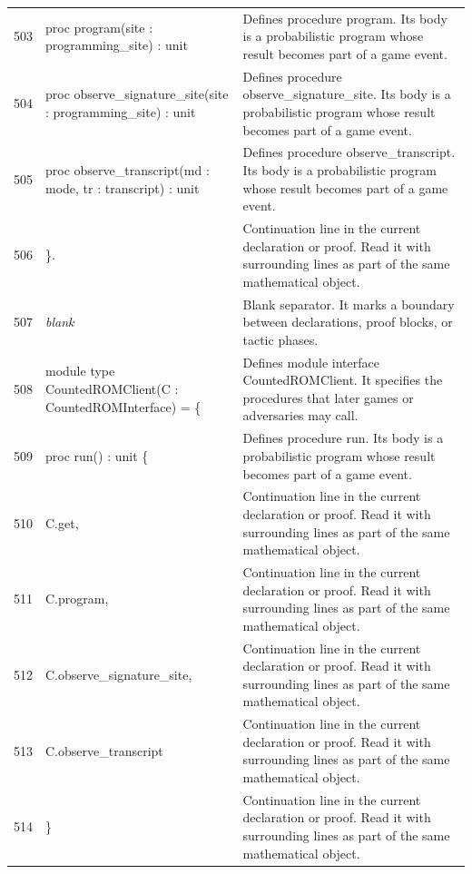\documentclass[10pt]{article}
\begin{document}
\begin{longtable}{r L{0.53\textwidth} L{0.37\textwidth}}
503 & {\ttfamily\scriptsize   proc program(site : programming\_site) : unit} & Defines procedure program.  Its body is a probabilistic program whose result becomes part of a game event. \\
504 & {\ttfamily\scriptsize   proc observe\_signature\_site(site : programming\_site) : unit} & Defines procedure observe\_signature\_site.  Its body is a probabilistic program whose result becomes part of a game event. \\
505 & {\ttfamily\scriptsize   proc observe\_transcript(md : mode, tr : transcript) : unit} & Defines procedure observe\_transcript.  Its body is a probabilistic program whose result becomes part of a game event. \\
506 & {\ttfamily\scriptsize \}.} & Continuation line in the current declaration or proof.  Read it with surrounding lines as part of the same mathematical object. \\
507 & {\ttfamily\scriptsize \emph{blank}} & Blank separator.  It marks a boundary between declarations, proof blocks, or tactic phases. \\
508 & {\ttfamily\scriptsize module type CountedROMClient(C : CountedROMInterface) = \{} & Defines module interface CountedROMClient.  It specifies the procedures that later games or adversaries may call. \\
509 & {\ttfamily\scriptsize   proc run() : unit \{} & Defines procedure run.  Its body is a probabilistic program whose result becomes part of a game event. \\
510 & {\ttfamily\scriptsize     C.get,} & Continuation line in the current declaration or proof.  Read it with surrounding lines as part of the same mathematical object. \\
511 & {\ttfamily\scriptsize     C.program,} & Continuation line in the current declaration or proof.  Read it with surrounding lines as part of the same mathematical object. \\
512 & {\ttfamily\scriptsize     C.observe\_signature\_site,} & Continuation line in the current declaration or proof.  Read it with surrounding lines as part of the same mathematical object. \\
513 & {\ttfamily\scriptsize     C.observe\_transcript} & Continuation line in the current declaration or proof.  Read it with surrounding lines as part of the same mathematical object. \\
514 & {\ttfamily\scriptsize   \}} & Continuation line in the current declaration or proof.  Read it with surrounding lines as part of the same mathematical object. \\

\end{longtable}
\end{document}
